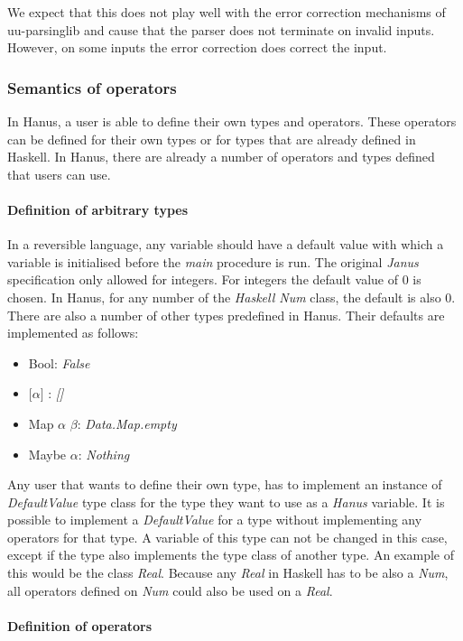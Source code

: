 \documentclass[12pt,a4paper]{article}
\begin{document}
We expect that this does not play well with the error correction mechanisms of uu-parsinglib and cause that the parser does not terminate on invalid inputs. However, on some inputs the error correction does correct the input.

    \subsubsection{Semantics of operators}  
    In Hanus, a user is able to define their own types and operators. These operators can be defined for their own types or for types that are already defined in Haskell. In Hanus, there are already a number of operators and types defined that users can use. 
    \paragraph{Definition of arbitrary types}
    In a reversible language, any variable should have a default value with which a variable is initialised before the \textit{main} procedure is run. The original \textit{Janus} specification only allowed for integers. For integers the default value of 0 is chosen. In Hanus, for any number of the \textit{Haskell Num} class, the default is also 0. There are also a number of other types predefined in Hanus. Their defaults are implemented as follows:
    \begin{itemize}
        \item Bool: \textit{False}
        \item $\lbrack\alpha\rbrack$ : \textit{[]}
        \item Map $\alpha$ $\beta$: \textit{Data.Map.empty}
        \item Maybe $\alpha$: \textit{Nothing}
    \end{itemize}
    Any user that wants to define their own type, has to implement an instance of \textit{DefaultValue} type class for the type they want to use as a \textit{Hanus} variable. It is possible to implement a \textit{DefaultValue} for a type without implementing any operators for that type. A variable of this type can not be changed in this case, except if the type also implements the type class of another type. An example of this would be the class \textit{Real}. Because any \textit{Real} in Haskell has to be also a \textit{Num}, all operators defined on \textit{Num} could also be used on a \textit{Real}.
    
    \paragraph{Definition of operators}
\end{document}
